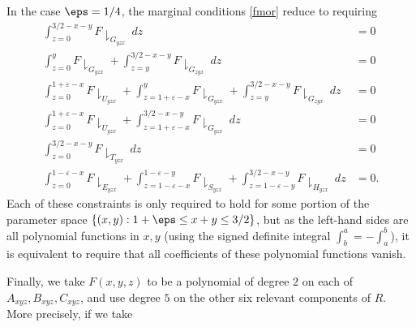 In the case $\eps=1/4$, the marginal conditions \eqref{fmor} reduce to requiring 
\begin{align}
\int_{z=0}^{3/2-x-y}F\downharpoonright_{G_{yzx}}\ dz &= 0\label{m1}\\
\int_{z=0}^{y}F\downharpoonright_{G_{yzx}} +\int_{z=y}^{3/2-x-y}F\downharpoonright_{G_{zyx}}\ dz &= 0\label{m2}\\
\int_{z=0}^{1+\varepsilon-x}F\downharpoonright_{U_{yzx}} + \int_{z=1+\varepsilon-x}^{y}F\downharpoonright_{G_{yzx}} +\int_{z=y}^{3/2-x-y}F\downharpoonright_{G_{zyx}}\ dz &= 0\label{m3}\\
\int_{z=0}^{1+\varepsilon-x}F\downharpoonright_{U_{yzx}} + \int_{z=1+\varepsilon-x}^{3/2-x-y}F\downharpoonright_{G_{yzx}}\ dz &= 0\label{m4}\\
\int_{z=0}^{3/2-x-y}F\downharpoonright_{T_{yzx}}\ dz &= 0\label{m5}\\
\int_{z=0}^{1-\varepsilon-x}F\downharpoonright_{E_{yzx}} + \int_{z=1-\varepsilon-x}^{1-\varepsilon-y}F\downharpoonright_{S_{yzx}} + \int_{z=1-\varepsilon-y}^{3/2-x-y}F\downharpoonright_{H_{yzx}}\ dz &= 0.\label{m7}
\end{align}
Each of these constraints is only required to hold for some portion of the parameter space $\{ (x,y): 1+\eps \leq x+y \leq 3/2 \}$, but as the left-hand sides are all polynomial functions in $x,y$ (using the signed definite integral $\int_b^a = -\int_a^b$), it is equivalent to require that all coefficients of these polynomial functions vanish.

Finally, we take $F(x,y,z)$ to be a polynomial of degree $2$ on each of $A_{xyz},B_{xyz},C_{xyz}$, and use degree $5$ on the other six relevant components of $R$.  More precisely, if we take

